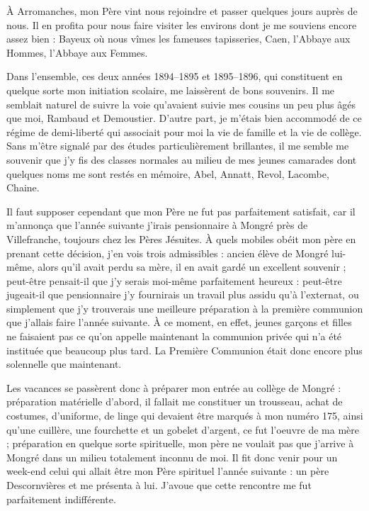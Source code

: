 \documentclass[11pt,a4paper]{report}
\begin{document}
À Arromanches, mon Père vint nous rejoindre et passer quelques jours auprès de nous. Il en profita pour nous faire visiter les environs dont je me souviens encore assez bien : Bayeux où nous vîmes les fameuses tapisseries, Caen, l'Abbaye aux Hommes, l'Abbaye aux Femmes.

Dans l'ensemble, ces deux années 1894--1895 et 1895--1896, qui constituent en quelque sorte mon initiation scolaire, me laissèrent de bons souvenirs. Il me semblait naturel de suivre la voie qu'avaient suivie mes cousins un peu plus âgés que moi, Rambaud et Demoustier. D'autre part, je m'étais bien accommodé de ce régime de demi-liberté qui associait pour moi la vie de famille et la vie de collège. Sans m'être signalé par des études particulièrement brillantes, il me semble me souvenir que j'y fis des classes normales au milieu de mes jeunes camarades dont quelques noms me sont restés en mémoire, Abel, Annatt, Revol, Lacombe, Chaine.

Il faut supposer cependant que mon Père ne fut pas parfaitement satisfait, car il m'annonça que l'année suivante j'irais pensionnaire à Mongré près de Villefranche, toujours chez les Pères Jésuites. À quels mobiles obéit mon père en prenant cette décision, j'en vois trois admissibles : ancien élève de Mongré lui-même, alors qu'il avait perdu sa mère, il en avait gardé un excellent souvenir ; peut-être pensait-il que j'y serais moi-même parfaitement heureux : peut-être jugeait-il que pensionnaire j'y fournirais un travail plus assidu qu'à l'externat, ou simplement que j'y trouverais une meilleure préparation à la première communion que j'allais faire l'année suivante. À ce moment, en effet, jeunes garçons et filles ne faisaient pas ce qu'on appelle maintenant la communion privée qui n'a été instituée que beaucoup plus tard. La Première Communion était donc encore plus solennelle que maintenant.

Les vacances se passèrent donc à préparer mon entrée au collège de Mongré : préparation matérielle d'abord, il fallait me constituer un trousseau, achat de costumes, d'uniforme, de linge qui devaient être marqués à mon numéro 175, ainsi qu'une cuillère, une fourchette et un gobelet d'argent, ce fut l'oeuvre de ma mère ; préparation en quelque sorte spirituelle, mon père ne voulait pas que j'arrive à Mongré dans un milieu totalement inconnu de moi. Il fit donc venir pour un week-end celui qui allait être mon Père spirituel l'année suivante : un père Descornvières et me présenta à lui. J'avoue que cette rencontre me fut parfaitement indifférente.
\end{document}
